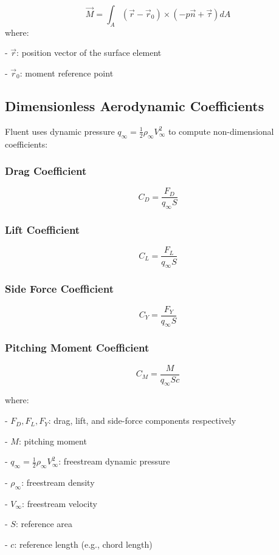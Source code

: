 \documentclass[12pt]{article}
\begin{document}
$$
\vec{M} = \int_{A} \left( \vec{r} - \vec{r}_0 \right) \times \left( -p \vec{n} + \vec{\tau} \right) dA
$$
where:
    
- $ \vec{r} $: position vector of the surface element
    
- $ \vec{r}_0 $: moment reference point

\subsection{Dimensionless Aerodynamic Coefficients}
Fluent uses dynamic pressure $ q_\infty = \frac{1}{2} \rho_\infty V_\infty^2 $ to compute non-dimensional coefficients:

\subsubsection*{Drag Coefficient}
$$
C_D = \frac{F_D}{q_\infty S}
$$

\subsubsection*{Lift Coefficient}
$$
C_L = \frac{F_L}{q_\infty S}
$$

\subsubsection*{Side Force Coefficient}
$$
C_Y = \frac{F_Y}{q_\infty S}
$$

\subsubsection*{Pitching Moment Coefficient}
$$
C_M = \frac{M}{q_\infty S c}
$$

where:
    
- $ F_D, F_L, F_Y $: drag, lift, and side-force components respectively
    
- $ M $: pitching moment
    
- $ q_\infty = \frac{1}{2} \rho_\infty V_\infty^2 $: freestream dynamic pressure
    
- $ \rho_\infty $: freestream density
    
- $ V_\infty $: freestream velocity
    
- $ S $: reference area
    
- $ c $: reference length (e.g., chord length)
\end{document}
